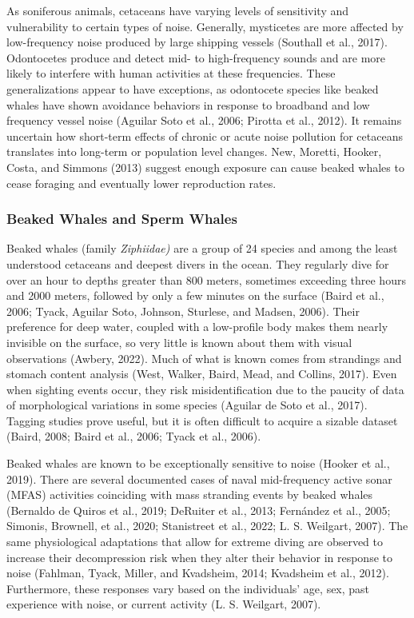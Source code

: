 \documentclass[
]{article}
\begin{document}
As soniferous animals, cetaceans have varying levels of sensitivity and
vulnerability to certain types of noise. Generally, mysticetes are more
affected by low-frequency noise produced by large shipping vessels
(Southall et al., 2017). Odontocetes produce and detect mid- to
high-frequency sounds and are more likely to interfere with human
activities at these frequencies. These generalizations appear to have
exceptions, as odontocete species like beaked whales have shown
avoidance behaviors in response to broadband and low frequency vessel
noise (Aguilar Soto et al., 2006; Pirotta et al., 2012). It remains
uncertain how short-term effects of chronic or acute noise pollution for
cetaceans translates into long-term or population level changes. New,
Moretti, Hooker, Costa, and Simmons (2013) suggest enough exposure can
cause beaked whales to cease foraging and eventually lower reproduction
rates.\\

\hypertarget{beaked-whales-and-sperm-whales}{%
\subsubsection{Beaked Whales and Sperm
Whales}\label{beaked-whales-and-sperm-whales}}

Beaked whales (family \emph{Ziphiidae)} are a group of 24 species and
among the least understood cetaceans and deepest divers in the ocean.
They regularly dive for over an hour to depths greater than 800 meters,
sometimes exceeding three hours and 2000 meters, followed by only a few
minutes on the surface (Baird et al., 2006; Tyack, Aguilar Soto,
Johnson, Sturlese, and Madsen, 2006). Their preference for deep water,
coupled with a low-profile body makes them nearly invisible on the
surface, so very little is known about them with visual observations
(Awbery, 2022). Much of what is known comes from strandings and stomach
content analysis (West, Walker, Baird, Mead, and Collins, 2017). Even
when sighting events occur, they risk misidentification due to the
paucity of data of morphological variations in some species (Aguilar de
Soto et al., 2017). Tagging studies prove useful, but it is often
difficult to acquire a sizable dataset (Baird, 2008; Baird et al., 2006;
Tyack et al., 2006).

Beaked whales are known to be exceptionally sensitive to noise (Hooker
et al., 2019). There are several documented cases of naval mid-frequency
active sonar (MFAS) activities coinciding with mass stranding events by
beaked whales (Bernaldo de Quiros et al., 2019; DeRuiter et al., 2013;
Fernández et al., 2005; Simonis, Brownell, et al., 2020; Stanistreet et
al., 2022; L. S. Weilgart, 2007). The same physiological adaptations
that allow for extreme diving are observed to increase their
decompression risk when they alter their behavior in response to noise
(Fahlman, Tyack, Miller, and Kvadsheim, 2014; Kvadsheim et al., 2012).
Furthermore, these responses vary based on the individuals' age, sex,
past experience with noise, or current activity (L. S. Weilgart, 2007).
\end{document}

